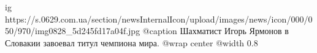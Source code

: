  
 
 
 
 

\ifcmt
  ig https://s.0629.com.ua/section/newsInternalIcon/upload/images/news/icon/000/050/970/img0828_5d245fd17a04f.jpg
	@caption Шахматист Игорь Ярмонов в Словакии завоевал титул чемпиона мира.
  @wrap center
  @width 0.8
\fi
